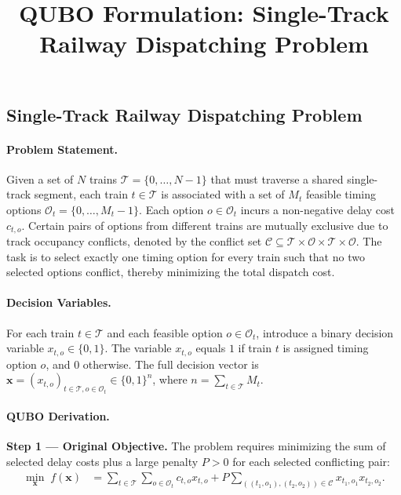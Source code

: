 \documentclass[12pt]{article}
\title{QUBO Formulation: Single-Track Railway Dispatching Problem}
\date{}
\begin{document}
\maketitle

\subsection*{Single-Track Railway Dispatching Problem}

\paragraph{Problem Statement.}
Given a set of $N$ trains $\mathcal{T} = \{0, \dots, N-1\}$ that must traverse a shared single-track segment, each train $t \in \mathcal{T}$ is associated with a set of $M_t$ feasible timing options $\mathcal{O}_t = \{0, \dots, M_t-1\}$. Each option $o \in \mathcal{O}_t$ incurs a non-negative delay cost $c_{t,o}$. Certain pairs of options from different trains are mutually exclusive due to track occupancy conflicts, denoted by the conflict set $\mathcal{C} \subseteq \mathcal{T} \times \mathcal{O} \times \mathcal{T} \times \mathcal{O}$. The task is to select exactly one timing option for every train such that no two selected options conflict, thereby minimizing the total dispatch cost.

\paragraph{Decision Variables.}
For each train $t \in \mathcal{T}$ and each feasible option $o \in \mathcal{O}_t$, introduce a binary decision variable $x_{t,o} \in \{0,1\}$. The variable $x_{t,o}$ equals $1$ if train $t$ is assigned timing option $o$, and $0$ otherwise. The full decision vector is $\mathbf{x} = (x_{t,o})_{t \in \mathcal{T}, o \in \mathcal{O}_t} \in \{0,1\}^n$, where $n = \sum_{t \in \mathcal{T}} M_t$.

\paragraph{QUBO Derivation.}
\textbf{Step 1 --- Original Objective.}
The problem requires minimizing the sum of selected delay costs plus a large penalty $P > 0$ for each selected conflicting pair:
\begin{align}
\min_{\mathbf{x}} \; f(\mathbf{x}) &= \sum_{t \in \mathcal{T}} \sum_{o \in \mathcal{O}_t} c_{t,o} x_{t,o} + P \sum_{((t_1,o_1),(t_2,o_2)) \in \mathcal{C}} x_{t_1,o_1} x_{t_2,o_2}.
\end{align}
\end{document}
